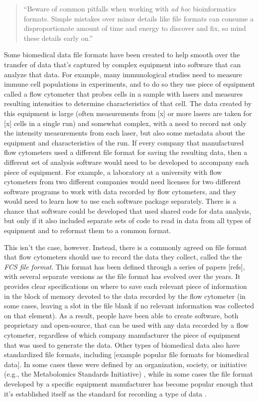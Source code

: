 \documentclass[]{tufte-book}
\begin{document}
\begin{quote}
``Beware of common pitfalls when working with \emph{ad hoc} bioinformatics formats.
Simple mistakes over minor details like file formats can consume a
disproportionate amount of time and energy to discover and fix, so mind these
details early on.'' \citep{buffalo2015bioinformatics}
\end{quote}

Some biomedical data file formats have been created to help smooth over the
transfer of data that's captured by complex equipment into software that can
analyze that data. For example, many immunological studies need to measure
immune cell populations in experiments, and to do so they use piece of
equipment called a flow cytometer that probes cells in a sample with lasers
and measures resulting intensities to determine characteristics of that cell.
The data created by this equipment is large (often measurements from {[}x{]} or more
lasers are taken for {[}x{]} cells in a single run) and somewhat complex, with a need
to record not only the intensity measurements from each laser, but also some metadata
about the equipment and characteristics of the run.
If every company that manufactured flow cytometers used a different file format for
saving the resulting data, then a different set of analysis software would need to
be developed to accompany each piece of equipment. For example, a laboratory at
a university with flow cytometers from two different companies would need licenses
for two different software programs to work with data recorded by flow cytometers,
and they would need to learn how to use each software package separately. There is a
chance that software could be developed that used shared code for data analysis, but only
if it also included separate sets of code to read in data from all types of equipment
and to reformat them to a common format.

This isn't the case, however. Instead, there is a commonly agreed on file
format that flow cytometers should use to record the data they collect, called
the the \emph{FCS file format}. This format has been defined through a series of
papers {[}refs{]}, with several separate versions as the file format has evolved
over the years. It provides clear specifications on where to save each relevant
piece of information in the block of memory devoted to the data recorded by the
flow cytometer (in some cases, leaving a slot in the file blank if no relevant
information was collected on that element). As a result, people have been able
to create software, both proprietary and open-source, that can be used with any
data recorded by a flow cytometer, regardless of which company manufacturer the
piece of equipment that was used to generate the data. Other types of biomedical
data also have standardized file formats, including {[}example popular file
formats for biomedical data{]}. In some cases these were defined by an
organization, society, or initiative (e.g., the Metabolomics Standards
Initiative) \citep{ghosh2011software}, while in some cases the file format developed
by a specific equipment manufacturer has become popular enough that it's
established itself as the standard for recording a type of data
\citep{brazma2006standards}.
\end{document}
